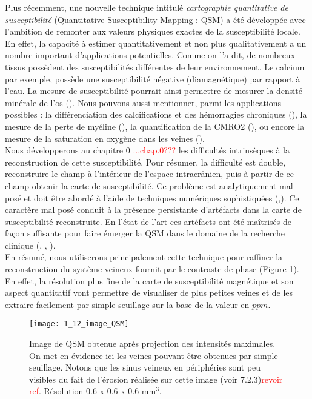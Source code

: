 Plus récemment, une nouvelle technique intitulé {\em cartographie quantitative de susceptibilité} (Quantitative Susceptibility Mapping : QSM) a été développée avec l’ambition de remonter aux valeurs physiques exactes de la susceptibilité locale. En effet, la capacité à estimer quantitativement et non plus qualitativement a un nombre important d’applications potentielles. Comme on l'a dit, de nombreux tissus possèdent des susceptibilités différentes de leur environnement. Le calcium par exemple, possède une susceptibilité négative (diamagnétique) par rapport à l’eau. La mesure de susceptibilité pourrait ainsi permettre de mesurer la densité minérale de l’os (\cite{Chung1996}). Nous pouvons aussi mentionner, parmi les applications possibles : la différenciation des calcifications et des hémorragies chroniques (\cite{Kozic2009}), la mesure de la perte de myéline (\cite{Liu2011}), la quantification de la CMRO2 (\cite{Zhang2014}), ou encore la mesure de la saturation en oxygène dans les veines (\cite{Fan2014}).\\
Nous développerons au chapitre 0 \textcolor{red}{...chap.0???} les difficultés intrinsèques à la reconstruction de cette susceptibilité. Pour résumer, la difficulté est double, reconstruire le champ à l’intérieur de l’espace intracrânien, puis à partir de ce champ obtenir la carte de susceptibilité. Ce problème est analytiquement mal posé et doit être abordé à l’aide de techniques numériques sophistiquées (\cite{Haacke2005},\cite{Shmueli2009}). Ce caractère mal posé conduit à la présence persistante d’artéfacts dans la carte de susceptibilité reconstruite. En l’état de l’art ces artéfacts ont été maîtrisés de façon suffisante pour faire émerger la QSM dans le domaine de la recherche clinique (\cite{Wang_Liu_2014}, \cite{Bilgic2013}, \cite{Deistung2013}).\\
En résumé, nous utiliserons principalement cette technique pour raffiner la reconstruction du système veineux fournit par le contraste de phase (Figure \ref{fig:1_12_image_QSM}). En effet, la résolution plus fine de la carte de susceptibilité magnétique et son aspect quantitatif vont permettre de visualiser de plus petites veines et de les extraire facilement par simple seuillage sur la base de la valeur en $ppm$.
\begin{figure}[!t]
\centering
\texttt{[image: 1\_12\_image\_QSM]}
\caption{Image de QSM obtenue après projection des intensités maximales. On met en évidence ici les veines pouvant être obtenues par simple seuillage. Notons que les sinus veineux en périphéries sont peu visibles du fait de l’érosion réalisée sur cette image (voir 7.2.3)\textcolor{red}{revoir ref}. Résolution 0.6 x 0.6 x 0.6 mm$^3$.}
\label{fig:1_12_image_QSM}	
\end{figure}

